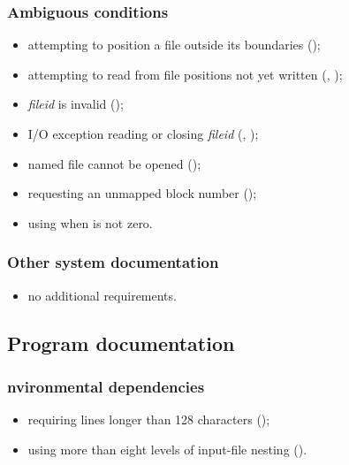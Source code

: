 \subsubsection{Ambiguous conditions} %
\begin{itemize}
\item attempting to position a file outside its boundaries
	();
\item attempting to read from file positions not yet written
	(, );
\item \emph{fileid} is invalid ();
\item I/O exception reading or closing \emph{fileid}
	(,
	 );
\item named file cannot be opened
	();
\item requesting an unmapped block number
	();
\item using  when
	 is not zero.
\end{itemize}

\subsubsection{Other system documentation} %
\begin{itemize}
\item no additional requirements.
\end{itemize}

\subsection{Program documentation} %

\subsubsection{nvironmental dependencies} %
\begin{itemize}
\item requiring lines longer than 128 characters
	();
\item using more than eight levels of input-file nesting
	().
\end{itemize}

